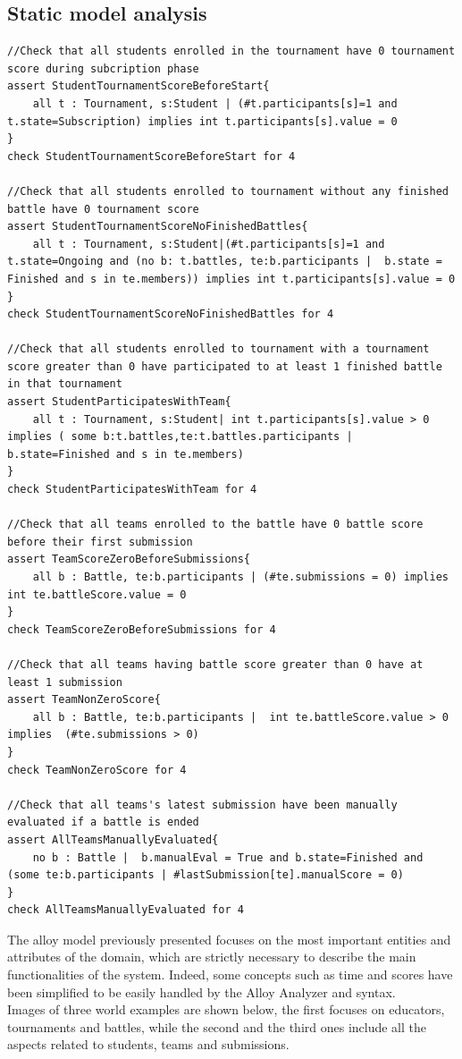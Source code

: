 \subsection{Static model analysis}
\begin{lstlisting}[language=alloy]
//Check that all students enrolled in the tournament have 0 tournament score during subcription phase
assert StudentTournamentScoreBeforeStart{
    all t : Tournament, s:Student | (#t.participants[s]=1 and t.state=Subscription) implies int t.participants[s].value = 0
}
check StudentTournamentScoreBeforeStart for 4

//Check that all students enrolled to tournament without any finished battle have 0 tournament score
assert StudentTournamentScoreNoFinishedBattles{
    all t : Tournament, s:Student|(#t.participants[s]=1 and t.state=Ongoing and (no b: t.battles, te:b.participants |  b.state = Finished and s in te.members)) implies int t.participants[s].value = 0
}
check StudentTournamentScoreNoFinishedBattles for 4

//Check that all students enrolled to tournament with a tournament score greater than 0 have participated to at least 1 finished battle in that tournament
assert StudentParticipatesWithTeam{
    all t : Tournament, s:Student| int t.participants[s].value > 0 implies ( some b:t.battles,te:t.battles.participants | b.state=Finished and s in te.members)
}
check StudentParticipatesWithTeam for 4

//Check that all teams enrolled to the battle have 0 battle score before their first submission
assert TeamScoreZeroBeforeSubmissions{
    all b : Battle, te:b.participants | (#te.submissions = 0) implies int te.battleScore.value = 0
}
check TeamScoreZeroBeforeSubmissions for 4

//Check that all teams having battle score greater than 0 have at least 1 submission
assert TeamNonZeroScore{
    all b : Battle, te:b.participants |  int te.battleScore.value > 0  implies  (#te.submissions > 0)
}
check TeamNonZeroScore for 4

//Check that all teams's latest submission have been manually evaluated if a battle is ended
assert AllTeamsManuallyEvaluated{
    no b : Battle |  b.manualEval = True and b.state=Finished and (some te:b.participants | #lastSubmission[te].manualScore = 0)
}
check AllTeamsManuallyEvaluated for 4

\end{lstlisting}
\hfill \break
The alloy model previously presented focuses on the most important entities and attributes of the domain, which are strictly necessary to describe the main functionalities of the system. Indeed, some concepts such as time and scores have been simplified to be easily handled by the Alloy Analyzer and syntax.\\
Images of three world examples are shown below, the first focuses on educators, tournaments and battles, while the second and the third ones include all the aspects related to students, teams and submissions.
\newpage
\thispagestyle{noheader}


